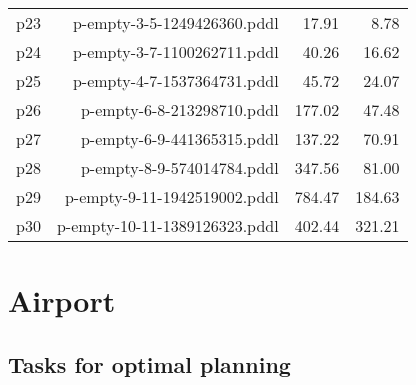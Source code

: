 \documentclass{article}
\begin{document}
\begin{center}
\begin{tabular}{@{}l|r|r|r@{}}
  p23& p-empty-3-5-1249426360.pddl&17.91&8.78\\
  p24& p-empty-3-7-1100262711.pddl&40.26&16.62\\
  p25& p-empty-4-7-1537364731.pddl&45.72&24.07\\
  p26& p-empty-6-8-213298710.pddl&177.02&47.48\\
  p27& p-empty-6-9-441365315.pddl&137.22&70.91\\
  p28& p-empty-8-9-574014784.pddl&347.56&81.00\\
  p29& p-empty-9-11-1942519002.pddl&784.47&184.63\\
  p30& p-empty-10-11-1389126323.pddl&402.44&321.21
                            \end{tabular}
                            \end{center}
                    
                \newpage \section{Airport}
                    \subsection*{Tasks for optimal planning}
                    
\end{document}

